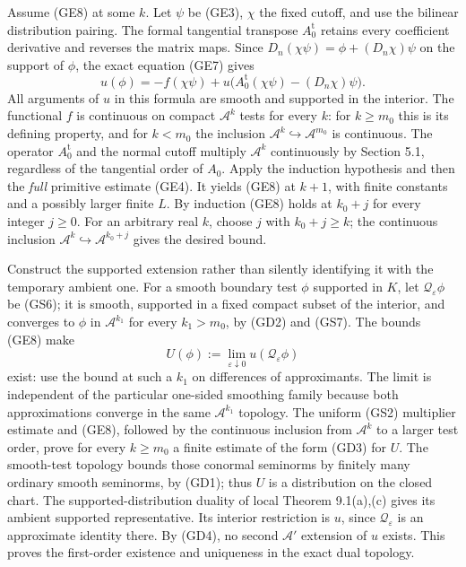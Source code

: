\documentclass[
  11pt,
]{article}
\begin{document}
Assume (GE8) at some \(k\). Let \(\psi\) be (GE3), \(\chi\) the fixed
cutoff, and use the bilinear distribution pairing. The formal tangential
transpose \(A_0^{\mathrm t}\) retains every coefficient derivative and
reverses the matrix maps. Since \(D_n(\chi\psi)=\phi+(D_n\chi)\psi\) on
the support of \(\phi\), the exact equation (GE7) gives \[
 u(\phi)
  =-f(\chi\psi)
   +u\bigl(A_0^{\mathrm t}(\chi\psi)
              -(D_n\chi)\psi\bigr).
 \tag{GE9}
\] All arguments of \(u\) in this formula are smooth and supported in
the interior. The functional \(f\) is continuous on compact
\(\mathcal A^k\) tests for every \(k\): for \(k\ge m_0\) this is its
defining property, and for \(k<m_0\) the inclusion
\(\mathcal A^k\hookrightarrow\mathcal A^{m_0}\) is continuous. The
operator \(A_0^{\mathrm t}\) and the normal cutoff multiply
\(\mathcal A^k\) continuously by Section 5.1, regardless of the
tangential order of \(A_0\). Apply the induction hypothesis and then the
\emph{full} primitive estimate (GE4). It yields (GE8) at \(k+1\), with
finite constants and a possibly larger finite \(L\). By induction (GE8)
holds at \(k_0+j\) for every integer \(j\ge0\). For an arbitrary real
\(k\), choose \(j\) with \(k_0+j\ge k\); the continuous inclusion
\(\mathcal A^k\hookrightarrow
\mathcal A^{k_0+j}\) gives the desired bound.

Construct the supported extension rather than silently identifying it
with the temporary ambient one. For a smooth boundary test \(\phi\)
supported in \(K\), let \(\mathcal Q_\varepsilon\phi\) be (GS6); it is
smooth, supported in a fixed compact subset of the interior, and
converges to \(\phi\) in \(\mathcal A^{k_1}\) for every \(k_1>m_0\), by
(GD2) and (GS7). The bounds (GE8) make \[
 U(\phi):=\lim_{\varepsilon\downarrow0}
                   u(\mathcal Q_\varepsilon\phi)
 \tag{GE10}
\] exist: use the bound at such a \(k_1\) on differences of
approximants. The limit is independent of the particular one-sided
smoothing family because both approximations converge in the same
\(\mathcal A^{k_1}\) topology. The uniform (GS2) multiplier estimate and
(GE8), followed by the continuous inclusion from \(\mathcal A^k\) to a
larger test order, prove for every \(k\ge m_0\) a finite estimate of the
form (GD3) for \(U\). The smooth-test topology bounds those conormal
seminorms by finitely many ordinary smooth seminorms, by (GD1); thus
\(U\) is a distribution on the closed chart. The supported-distribution
duality of local Theorem 9.1(a),(c) gives its ambient supported
representative. Its interior restriction is \(u\), since
\(\mathcal Q_\varepsilon\) is an approximate identity there. By (GD4),
no second \(\mathcal A'\) extension of \(u\) exists. This proves the
first-order existence and uniqueness in the exact dual topology.
\end{document}
